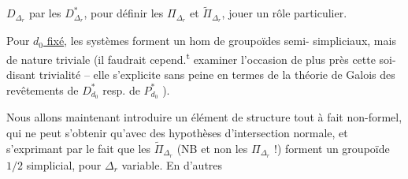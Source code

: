 $D_{\Delta_r}$ par les $D^*_{\Delta_r}$, pour définir les
$\Pi_{\Delta_r}$ et $\widetilde\Pi_{\Delta_r}$, 
jouer un rôle particulier.

Pour \uline{$d_0$ fixé}, les systèmes
forment un hom de groupoïdes semi-
simpliciaux, mais de nature 
triviale (il faudrait cepend.\textsuperscript{t} examiner
 l'occasion de plus près cette soi-disant
trivialité --  elle s'explicite sans peine
en termes de la théorie de Galois
des revêtements de $D^*_{d_0}$ resp. de $P^*_{d_0}$ \unsure{\ldots|--}).

Nous allons maintenant introduire
un élément de structure tout à fait
non-formel, qui ne peut s'obtenir
qu'avec des hypothèses 
d'intersection normale, et s'exprimant
par le fait que les $\widetilde\Pi_{\Delta_r}$ (NB et
non les $\Pi_{\Delta_r}$ !) forment un groupoïde
$1/2$ simplicial, pour $\Delta_r$ variable. En d'autres

